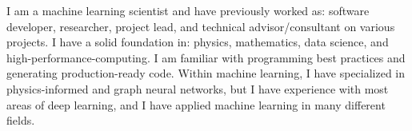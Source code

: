 



I am a machine learning scientist and have previously worked as: software developer, researcher, project lead, and technical advisor/consultant on various projects.
I have a solid foundation in: physics, mathematics, data science, and high-performance-computing.
I am familiar with programming best practices and generating production-ready code.
Within machine learning, I have specialized in physics-informed and graph neural networks, but I have experience with most areas of deep learning, and I have applied machine learning in many different fields.



